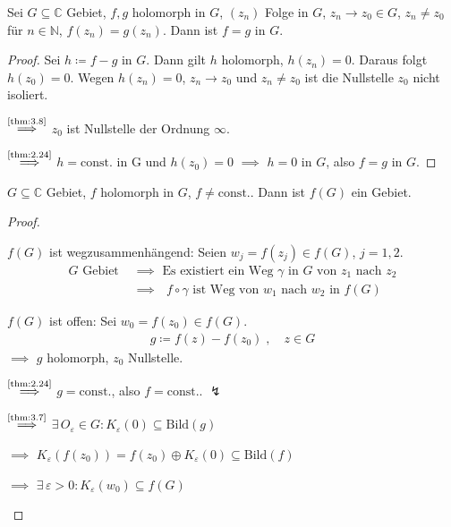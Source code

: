 \documentclass[a4paper,10pt]{scrbook}
\begin{document}
\begin{theorem}[Identitätssatz] \label{thm:3.10}
  Sei $G \subseteq \mathbb{C}$ Gebiet, $f,g$ holomorph in $G$, $(z_n)$ Folge in $G$, $z_n \to z_0 \in G$, $z_n \neq z_0$ für $n \in \mathbb{N}$, $f(z_n) = g(z_n)$. Dann ist $f=g$ in $G$.

  \begin{proof}
    Sei $h \coloneq f - g$ in $G$. Dann gilt $h$ holomorph, $h(z_n) = 0$. Daraus folgt $h(z_0) = 0$. Wegen $h(z_n) = 0$, $z_n \to z_0$ und $z_n \neq z_0$ ist die Nullstelle $z_0$ nicht isoliert.

    $\overset{\text{\ref{thm:3.8}}}{\implies}$ $z_0$ ist Nullstelle der Ordnung $\infty$.

    $\overset{\text{\ref{thm:2.24}}}{\implies}$ $h = \mathrm{const.}$ in G und $h(z_0) = 0$ $\implies$ $h=0$ in $G$, also $f=g$ in $G$.
  \end{proof}
\end{theorem}

\begin{theorem}[Gebietstreue] \label{thm:3.11}
  $G \subseteq \mathbb{C}$ Gebiet, $f$ holomorph in $G$, $f \neq \mathrm{const.}$. Dann ist $f(G)$ ein Gebiet.

  \begin{proof}
    \begin{enum-arab}
      \item $f(G)$ ist wegzusammenhängend: Seien $w_j = f(z_j) \in f(G)$, $j=1,2$.
      \begin{align*}
        \text{$G$ Gebiet }
        &\implies \text{ Es existiert ein Weg $\gamma$ in $G$ von $z_1$ nach $z_2$} \\
        &\implies \text{ $f \circ \gamma$ ist Weg von $w_1$ nach $w_2$ in $f(G)$}
      \end{align*}

      \item $f(G)$ ist offen: Sei $w_0 = f(z_0) \in f(G)$.
      \begin{align*}
        g \coloneq f(z) - f(z_0) \; , \quad z \in G
      \end{align*}
      $\implies$ $g$ holomorph, $z_0$ Nullstelle.


      $\overset{\text{\ref{thm:2.24}}}{\implies}$ $g = \mathrm{const.}$, also $f = \mathrm{const.}$. $\lightning$


      $\overset{\text{\ref{thm:3.7}}}{\implies}$ $\exists \, O_\varepsilon \in G : K_\varepsilon(0) \subseteq \mathrm{Bild}(g)$

      $\implies$ $K_\varepsilon(f(z_0)) = f(z_0) \oplus K_\varepsilon(0) \subseteq \mathrm{Bild}(f)$

      $\implies$ $\exists \, \varepsilon > 0 : K_\varepsilon(w_0) \subseteq f(G)$
    \end{enum-arab}
  \end{proof}
\end{theorem}
\end{document}

